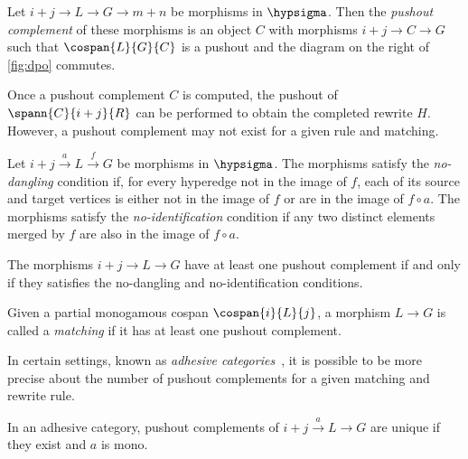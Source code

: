 \begin{definition}\label{def:pushout-complement}
    Let \(i + j \to L \to G \rightarrow m + n\) be morphisms in \(\hypsigma\).
    Then the \emph{pushout complement} of these morphisms is an object \(C\)
    with morphisms \(i + j \to C \to G\) such that \(\cospan{L}{G}{C}\) is a
    pushout and the diagram on the right of \cref{fig:dpo} commutes.
\end{definition}

Once a pushout complement \(C\) is computed, the pushout of
\(\spann{C}{i+j}{R}\) can be performed to obtain the completed rewrite \(H\).
However, a pushout complement may not exist for a given rule and matching.

\begin{definition}
    Let \(i + j \xrightarrow{a} L \xrightarrow{f} G\) be morphisms in
    \(\hypsigma\).
    The morphisms satisfy the \emph{no-dangling} condition if, for every
    hyperedge not in the image of \(f\), each of its source and target vertices
    is either not in the image of \(f\) or are in the image of \(f \circ a\).
    The morphisms satisfy the \emph{no-identification} condition if any two
    distinct elements merged by \(f\) are also in the image of \(f \circ a\).
\end{definition}

\begin{proposition}
    \label{prop:pushout-complement}
    The morphisms \(i + j \to L \to G\) have at least one pushout complement if
    and only if they satisfies the no-dangling and no-identification conditions.
\end{proposition}

\begin{definition}
    Given a partial monogamous cospan \(\cospan{i}{L}{j}\), a morphism
    \(L \to G\) is called a \emph{matching} if it has at least one pushout
    complement.
\end{definition}

In certain settings, known as
\emph{adhesive categories}~\cite{lack2004adhesive}, it is possible to be more
precise about the number of pushout complements for a given matching and rewrite
rule.

\begin{proposition}
    In an adhesive category, pushout complements of \(
        i + j \xrightarrow{a} L \to G\)
    are unique if they exist and \(a\) is mono.
\end{proposition}

